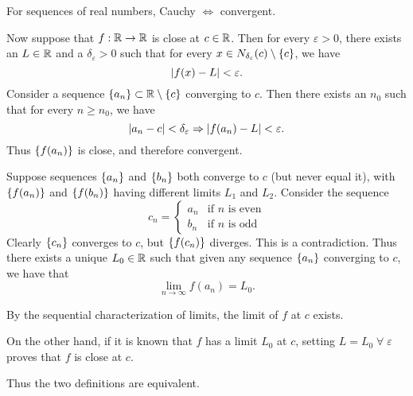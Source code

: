 \documentclass[12pt]{article}
\begin{document}
For sequences of real numbers, Cauchy $\iff$ convergent.

Now suppose that $f : \mathbb{R} \to \mathbb{R}$ is close at $c \in \mathbb{R}$.
Then for every $\varepsilon > 0$, there exists an $L \in \mathbb{R}$ and a $\delta_{\varepsilon} > 0$ such that for every $x \in N_{\delta_{\varepsilon}}(c) \setminus \set{c}$, we have \[
    \abs{ f(x) - L } < \varepsilon.
\]
Consider a sequence $\set{a_{n}} \subset \R \setminus \set{c}$ converging to $c$.
Then there exists an $n_{0}$ such that for every $n \geq n_{0}$, we have \[
    \abs{ a_{n} - c } < \delta_{\varepsilon} \implies \abs{ f(a_{n}) - L } < \varepsilon.
\] Thus $\set{f(a_{n})}$ is close, and therefore convergent.

Suppose sequences $\set{a_{n}}$ and $\set{b_{n}}$ both converge to $c$ (but never equal it), with $\set{f(a_{n})}$ and $\set{f(b_{n})}$ having different limits $L_{1}$ and $L_{2}$. Consider the sequence \[
    c_{n} = \begin{cases}
        a_{n} & \text{if } n \text{ is even} \\
        b_{n} & \text{if } n \text{ is odd}
    \end{cases}
\] Clearly $\set{c_{n}}$ converges to $c$, but $\set{f(c_{n})}$ diverges. This is a contradiction. Thus there exists a unique $L_{0} \in \mathbb{R}$ such that given any sequence $\set{a_{n}}$ converging to $c$, we have that \[
    \lim_{n \to \infty} f(a_{n}) = L_{0}.
\]

By the sequential characterization of limits, the limit of $f$ at $c$ exists.

On the other hand, if it is known that $f$ has a limit $L_{0}$ at $c$, setting $L = L_{0} \;\forall\; \varepsilon$ proves that $f$ is close at $c$.

Thus the two definitions are equivalent.
\end{document}
